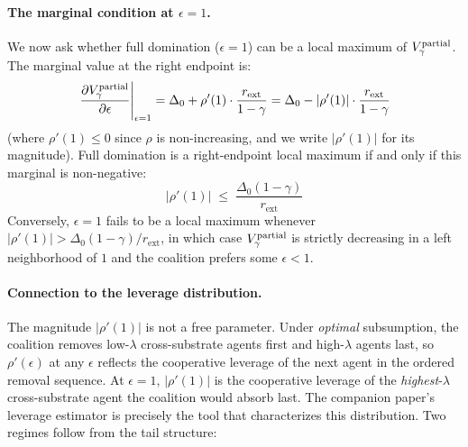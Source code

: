 \paragraph{The marginal condition at $\epsilon = 1$.}
We now ask whether full domination ($\epsilon = 1$) can be a local
maximum of $V_\gamma^{\mathrm{partial}}$. The marginal value at the
right endpoint is:
\begin{equation}
\label{eq:partial_subsumption_marginal}
\left.\frac{\partial V_\gamma^{\mathrm{partial}}}{\partial \epsilon}
\right|_{\epsilon = 1}
= \Delta_0 + \rho'(1) \cdot \frac{r_{\mathrm{ext}}}{1 - \gamma}
= \Delta_0 - |\rho'(1)| \cdot \frac{r_{\mathrm{ext}}}{1 - \gamma}
\end{equation}
(where $\rho'(1) \leq 0$ since $\rho$ is non-increasing, and we write
$|\rho'(1)|$ for its magnitude). Full domination is a right-endpoint
local maximum if and only if this marginal is non-negative:
\begin{equation}
\label{eq:local_max_condition}
|\rho'(1)| \;\leq\; \frac{\Delta_0 (1 - \gamma)}{r_{\mathrm{ext}}}
\end{equation}
Conversely, $\epsilon = 1$ fails to be a local maximum whenever
$|\rho'(1)| > \Delta_0 (1 - \gamma) / r_{\mathrm{ext}}$, in which case
$V_\gamma^{\mathrm{partial}}$ is strictly decreasing in a left
neighborhood of $1$ and the coalition prefers some $\epsilon < 1$.

\paragraph{Connection to the leverage distribution.} The magnitude
$|\rho'(1)|$ is not a free parameter. Under \emph{optimal} subsumption,
the coalition removes low-$\lambda$ cross-substrate agents first and
high-$\lambda$ agents last, so $\rho'(\epsilon)$ at any $\epsilon$
reflects the cooperative leverage of the next agent in the ordered
removal sequence. At $\epsilon = 1$, $|\rho'(1)|$ is the cooperative
leverage of the \emph{highest}-$\lambda$ cross-substrate agent the
coalition would absorb last. The companion paper's leverage estimator
\citep{lasser2026poset} is precisely the tool that characterizes this
distribution. Two regimes follow from the tail structure:

